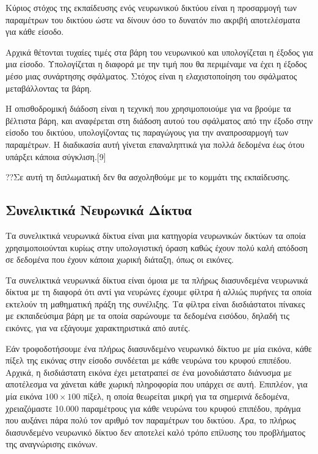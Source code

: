 Κύριος στόχος της εκπαίδευσης ενός νευρωνικού δικτύου είναι η προσαρμογή των παραμέτρων του δικτύου ώστε να δίνουν όσο το δυνατόν πιο ακριβή αποτελέσματα για κάθε είσοδο. 

Αρχικά θέτονται τυχαίες τιμές στα βάρη του νευρωνικού και υπολογίζεται η έξοδος για μια είσοδο. Υπολογίζεται η διαφορά με την τιμή που θα περιμέναμε να έχει η έξοδος μέσο μιας συνάρτησης σφάλματος. Στόχος είναι η ελαχιστοποίηση του σφάλματος μεταβάλλοντας τα βάρη.

Η οπισθοδρομική διάδοση είναι η τεχνική που χρησιμοποιούμε για να βρούμε τα βέλτιστα βάρη, και αναφέρεται στη διάδοση αυτού του σφάλματος από την έξοδο στην είσοδο του δικτύου, υπολογίζοντας τις παραγώγους για την αναπροσαρμογή των παραμέτρων. Η διαδικασία αυτή γίνεται επαναληπτικά για πολλά δεδομένα έως ότου υπάρξει κάποια σύγκλιση.[9]

??Σε αυτή τη διπλωματική δεν θα ασχοληθούμε με το κομμάτι της εκπαίδευσης.

\subsection{Συνελικτικά Νευρωνικά Δίκτυα}

Τα συνελικτικά νευρωνικά δίκτυα   είναι μια κατηγορία νευρωνικών δικτύων τα οποία χρησιμοποιούνται κυρίως στην υπολογιστική όραση καθώς έχουν πολύ καλή απόδοση σε δεδομένα που έχουν κάποια χωρική διάταξη, όπως οι εικόνες.

Τα συνελικτικά νευρωνικά δίκτυα είναι όμοια με τα πλήρως διασυνδεμένα νευρωνικά δίκτυα με τη διαφορά ότι αντί για νευρώνες έχουμε φίλτρα ή αλλιώς πυρήνες τα οποία εκτελούν τη μαθηματική πράξη της συνέλιξης. Τα φίλτρα είναι δισδιάστατοι πίνακες με εκπαιδεύσιμα βάρη με τα οποία σαρώνουμε τα δεδομένα εισόδου, δηλαδή τις εικόνες, για να εξάγουμε χαρακτηριστικά από αυτές. 

Εάν τροφοδοτήσουμε ένα πλήρως διασυνδεμένο νευρωνικό δίκτυο με μία εικόνα, κάθε πίξελ της εικόνας στην είσοδο συνδέεται με κάθε νευρώνα του κρυφού επιπέδου. Αρχικά, η δισδιάστατη εικόνα έχει μετατραπεί σε ένα μονοδιάστατο διάνυσμα με αποτέλεσμα να χάνεται κάθε χωρική πληροφορία που υπάρχει σε αυτή. Επιπλέον, για μία εικόνα $100\times100$ πίξελ, η οποία θεωρείται μικρή για τα σημερινά δεδομένα, χρειαζόμαστε 10.000 παραμέτρους για κάθε νευρώνα του κρυφού επιπέδου, πράγμα που αυξάνει πάρα πολύ τον αριθμό τον παραμέτρων του δικτύου.  Άρα, το πλήρως διασυνδεμένο νευρωνικό δίκτυο δεν αποτελεί καλό τρόπο επίλυσης του προβλήματος της αναγνώρισης εικόνων.

